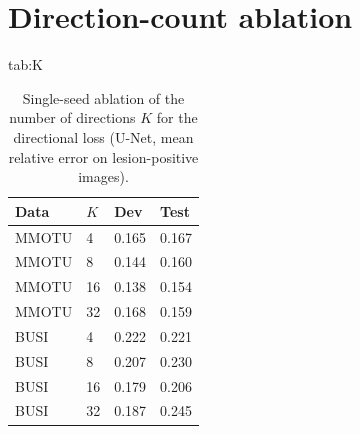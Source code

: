 \documentclass{midl}
\begin{document}
\section{Direction-count ablation}\label{app:K}
\begin{table}[htbp]
\floatconts
  {tab:K}
  {\caption{Single-seed ablation of the number of directions $K$ for the directional loss (U-Net, mean relative error on lesion-positive images).}}
  {\small\begin{tabular}{llll}
  \toprule
  Data & $K$ & Dev & Test\\
  \midrule
  MMOTU & 4 & 0.165 & 0.167 \\
MMOTU & 8 & 0.144 & 0.160 \\
MMOTU & 16 & 0.138 & 0.154 \\
MMOTU & 32 & 0.168 & 0.159 \\
BUSI & 4 & 0.222 & 0.221 \\
BUSI & 8 & 0.207 & 0.230 \\
BUSI & 16 & 0.179 & 0.206 \\
BUSI & 32 & 0.187 & 0.245 \\
  \bottomrule
  \end{tabular}}
\end{table}
\end{document}
